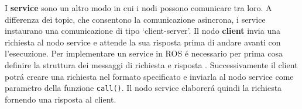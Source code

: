 I \textbf{service} sono un altro modo in cui i nodi possono comunicare tra loro. A differenza dei topic, che consentono la comunicazione 
asincrona, i service instaurano una comunicazione di tipo `client-server'. Il nodo \textbf{client} invia una richiesta al nodo service e 
attende la sua risposta prima di andare avanti con l'esecuzione. 
Per implementare un service in ROS \'{e} necessario per prima cosa definire la struttura dei messaggi di richiesta e 
risposta \cite{service}. Successivamente il client potr\'{a} creare una richiesta nel formato specificato e inviarla al nodo service  
come parametro della funzione \verb|call()|. 
Il nodo service elaborer\'{a} quindi la richiesta fornendo una risposta al client.